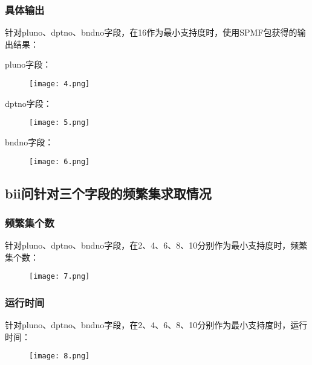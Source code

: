 \documentclass{article}
\begin{document}
\begin{CJK}{UTF8}{gbsn}
\subsubsection{具体输出}
针对pluno、dptno、bndno字段，在16作为最小支持度时，使用SPMF包获得的输出结果：

pluno字段：
\begin{figure}[!h]
\begin{center}
  \texttt{[image: 4.png]}	
\end{center}
\end{figure}

dptno字段：
\begin{figure}[!h]
\begin{center}
  \texttt{[image: 5.png]}	
\end{center}
\end{figure}

bndno字段：
\begin{figure}[!h]
\begin{center}
  \texttt{[image: 6.png]}	
\end{center}
\end{figure}


\subsection{bii问针对三个字段的频繁集求取情况}
\subsubsection{频繁集个数}
针对pluno、dptno、bndno字段，在2、4、6、8、10分别作为最小支持度时，频繁集个数：

\clearpage
\begin{figure}[!h]
\begin{center}
  \texttt{[image: 7.png]}	
\end{center}
\end{figure}

\subsubsection{运行时间}
针对pluno、dptno、bndno字段，在2、4、6、8、10分别作为最小支持度时，运行时间：
\begin{figure}[!h]
\begin{center}
  \texttt{[image: 8.png]}	
\end{center}
\end{figure}


\end{CJK}
\end{document}
